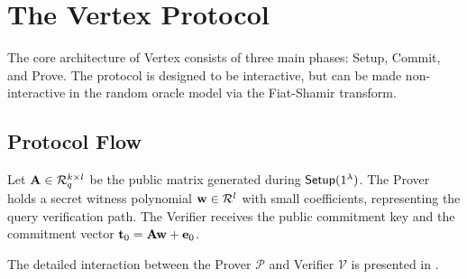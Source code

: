 \section{The Vertex Protocol}
\label{sec:protocol}

The core architecture of Vertex consists of three main phases: \textsf{Setup}, \textsf{Commit}, and \textsf{Prove}. The protocol is designed to be interactive, but can be made non-interactive in the random oracle model via the Fiat-Shamir transform.

\subsection{Protocol Flow}
Let $\mathbf{A} \in \mathcal{R}_q^{k \times l}$ be the public matrix generated during $\textsf{Setup}(1^\lambda)$. The Prover holds a secret witness polynomial $\mathbf{w} \in \mathcal{R}^l$ with small coefficients, representing the query verification path. The Verifier receives the public commitment key and the commitment vector $\mathbf{t}_0 = \mathbf{A}\mathbf{w} + \mathbf{e}_0$.

The detailed interaction between the Prover $\mathcal{P}$ and Verifier $\mathcal{V}$ is presented in .

